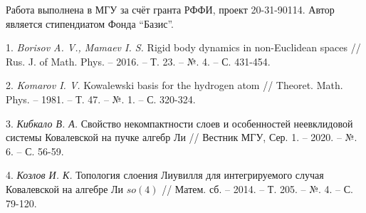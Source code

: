 \begin{figure}[h]
			\label{bif_diagr}
		\end{figure}



Работа выполнена в МГУ за счёт гранта РФФИ, проект 20-31-90114. Автор является стипендиатом Фонда ``Базис''.

\litlist

1. {\it Borisov A. V., Mamaev I. S.} Rigid body dynamics in non-Euclidean spaces  // Rus. J. of
Math. Phys. – 2016. – Т. 23. – №. 4. – С. 431-454.

2. {\it Komarov I. V.} Kowalewski basis for the hydrogen atom
  // Theoret. Math. Phys. – 1981. – Т. 47. – №. 1. – С. 320-324.

3. {\it Кибкало В. А.} Свойство некомпактности слоев и особенностей неевклидовой системы Ковалевской на пучке алгебр Ли  // Вестник МГУ, Сер. 1. – 2020. – №. 6. – С. 56-59.

4. {\it Козлов И. К.} Топология слоения Лиувилля для интегрируемого случая Ковалевской на алгебре Ли $so(4)$
  // Матем. сб. – 2014. – Т. 205. – №. 4. – С. 79-120.
